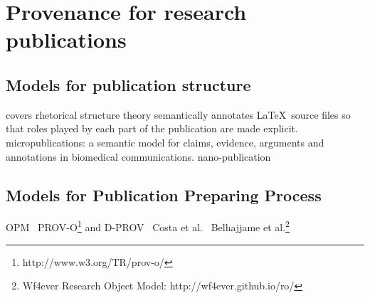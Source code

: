 \section{Provenance for research publications}
\subsection{Models for publication structure}
\cite{taboada2006rhetorical} covers rhetorical structure theory
\cite{groza2007salt} semantically annotates \LaTeX \ source files so that roles played by each part of the publication are made explicit.
\cite{clark2013micropublications} micropublications: a semantic model for claims, evidence, arguments and annotations in biomedical communications.
\cite{mons2009nano} nano-publication

\subsection{Models for Publication Preparing Process}
OPM~\cite{moreau2011open}
PROV-O\footnote{http://www.w3.org/TR/prov-o/} and 
D-PROV~\cite{missier2013d}
Costa et al.~\cite{costa2013capturing}
Belhajjame et al.\footnote{Wf4ever Research Object Model: http://wf4ever.github.io/ro/}

